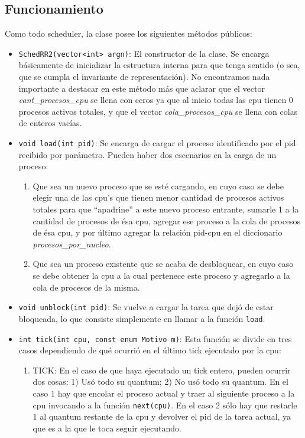 \subsection{Funcionamiento} Como todo scheduler, la clase posee los siguientes m\'etodos p\'ublicos:
\begin{itemize}
	\item \texttt{SchedRR2(vector<int> argn)}: El constructor de la clase. Se encarga b\'asicamente de inicializar la estructura interna para que tenga sentido (o sea, que se cumpla el invariante de representaci\'on). No encontramos nada importante a destacar en este m\'etodo m\'as que aclarar que el vector \emph{cant\_procesos\_cpu} se llena con ceros ya que al inicio todas las cpu tienen 0 procesos activos totales, y que el vector \emph{cola\_procesos\_cpu} se llena con colas de enteros vac\'ias.
	\item \texttt{void load(int pid)}: Se encarga de cargar el proceso identificado por el pid recibido por par\'ametro. Pueden haber dos escenarios en la carga de un proceso:
	\begin{enumerate}
		\item Que sea un nuevo proceso que se est\'e cargando, en cuyo caso se debe elegir una de las cpu's que tienen menor cantidad de procesos activos totales para que ``apadrine'' a este nuevo proceso entrante, sumarle 1 a la cantidad de procesos de \'esa cpu, agregar ese proceso a la cola de procesos de \'esa cpu, y por \'ultimo agregar la relaci\'on pid-cpu en el diccionario \emph{procesos\_por\_nucleo}.
		\item Que sea un proceso existente que se acaba de desbloquear, en cuyo caso se debe obtener la cpu a la cual pertenece este proceso y agregarlo a la cola de procesos de la misma.
	\end{enumerate}
	\item \texttt{void unblock(int pid)}: Se vuelve a cargar la tarea que dej\'o de estar bloqueada, lo que consiste simplemente en llamar a la funci\'on \texttt{load}.
	\item \texttt{int tick(int cpu, const enum Motivo m)}: Esta funci\'on se divide en tres casos dependiendo de qu\'e ocurri\'o en el \'ultimo tick ejecutado por la cpu:
	\begin{enumerate}
		\item TICK: En el caso de que haya ejecutado un tick entero, pueden ocurrir dos cosas: 1) Us\'o todo su quantum; 2) No us\'o todo su quantum. En el caso 1 hay que encolar el proceso actual y traer al siguiente proceso a la cpu invocando a la funci\'on \texttt{next(cpu)}. En el caso 2 s\'olo hay que restarle 1 al quantum restante de la cpu y devolver el pid de la tarea actual, ya que es a la que le toca seguir ejecutando.

\end{enumerate}
\end{itemize}
